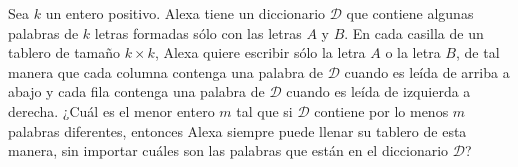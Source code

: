 Sea $k$ un entero positivo. Alexa tiene un diccionario $\mathcal D$ que contiene algunas palabras de $k$ letras formadas sólo con las letras $A$ y $B$. En cada casilla de un tablero de tamaño $k\times k$, Alexa quiere escribir sólo la letra $A$ o la letra $B$, de tal manera que cada columna contenga una palabra de $\mathcal D$ cuando es leída de arriba a abajo y cada fila contenga una palabra de $\mathcal D$ cuando es leída de izquierda a derecha. ¿Cuál es el menor entero $m$ tal que si $\mathcal D$ contiene por lo menos $m$ palabras diferentes, entonces Alexa siempre puede llenar su tablero de esta manera, sin importar cuáles son las palabras que están en el diccionario $\mathcal D$?